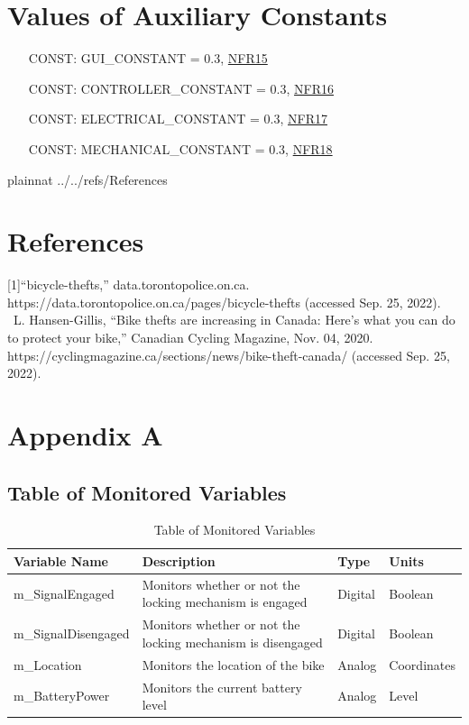 \documentclass[12pt]{article}
\newcounter{constnum} %
\begin{document}
\section{Values of Auxiliary Constants}

\begin{itemize}
\setlength{\itemindent}{0.5in} \item[CONST\refstepcounter{constnum}\theconstnum\label{LC_meaningfulLabel}:] GUI\_CONSTANT = 0.3, \hyperref[NFRGUI]{NFR15}
\item[CONST\refstepcounter{constnum}\theconstnum\label{LC_meaningfulLabel}:] CONTROLLER\_CONSTANT = 0.3, \hyperref[NFRController]{NFR16}
\item[CONST\refstepcounter{constnum}\theconstnum\label{LC_meaningfulLabel}:] ELECTRICAL\_CONSTANT = 0.3, \hyperref[NFRCircuit]{NFR17}
\item[CONST\refstepcounter{constnum}\theconstnum\label{LC_meaningfulLabel}:] MECHANICAL\_CONSTANT = 0.3, \hyperref[NFRMech]{NFR18}
\end{itemize}

\newpage

 {plainnat}
 {../../refs/References}
\newpage
\section{References}

[1]“bicycle-thefts,” data.torontopolice.on.ca. https://data.torontopolice.on.ca/pages/bicycle-thefts (accessed Sep. 25, 2022).
~\newline
[2]L. Hansen-Gillis, “Bike thefts are increasing in Canada: Here’s what you can do to protect your bike,” Canadian Cycling Magazine, Nov. 04, 2020. https://cyclingmagazine.ca/sections/news/bike-theft-canada/ (accessed Sep. 25, 2022).
\newpage
\section{Appendix A}
\subsection{Table of Monitored Variables}
\newpage
\begin{table}
\caption{Table of Monitored Variables} \label{Table of Monitored Variables}
\begin{tabular}{| p{} | p{} | p{} | p{} |}
 \hline
 Variable Name & Description & Type & Units \\ 
 \hline
 m\_SignalEngaged & Monitors whether or not the locking mechanism is engaged & Digital & Boolean \\ 
  \hline
 m\_SignalDisengaged & Monitors whether or not the locking mechanism is disengaged & Digital & Boolean \\ 
  \hline
 m\_Location & Monitors the location of the bike & Analog & Coordinates \\ 
  \hline
 m\_BatteryPower & Monitors the current battery level & Analog & Level \\ 
 \hline
\end{tabular}
\end{table}
\end{document}
